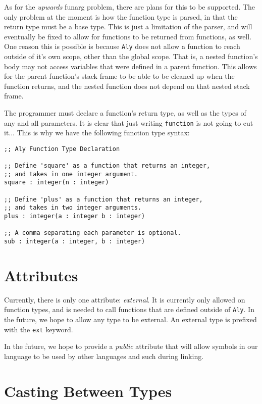 \documentclass[12pt]{report}
\begin{document}
As for the \emph{upwards} funarg problem, there are plans for this to be supported. The only problem at the moment is how the function type is parsed, in that the return type must be a base type. This is just a limitation of the parser, and will eventually be fixed to allow for functions to be returned from functions, as well. One reason this is possible is because \verb|Aly| does not allow a function to reach outside of it's own scope, other than the global scope. That is, a nested function's body may not access variables that were defined in a parent function. This allows for the parent function's stack frame to be able to be cleaned up when the function returns, and the nested function does not depend on that nested stack frame.

The programmer must declare a function's return type, as well as the types of any and all parameters. It is clear that just writing \verb|function| is not going to cut it... This is why we have the following function type syntax:
\begin{Verbatim}[samepage=true]
;; Aly Function Type Declaration

;; Define 'square' as a function that returns an integer,
;; and takes in one integer argument.
square : integer(n : integer)

;; Define 'plus' as a function that returns an integer,
;; and takes in two integer arguments.
plus : integer(a : integer b : integer)

;; A comma separating each parameter is optional.
sub : integer(a : integer, b : integer)
\end{Verbatim}

\section*{Attributes}
\label{subsec:types-attributes}

Currently, there is only one attribute: \emph{external}. It is currently only allowed on function types, and is needed to call functions that are defined outside of \verb|Aly|. In the future, we hope to allow any type to be external. An external type is prefixed with the \verb|ext| keyword.

In the future, we hope to provide a \emph{public} attribute that will allow symbols in our language to be used by other languages and such during linking.

\section*{Casting Between Types}
\end{document}

